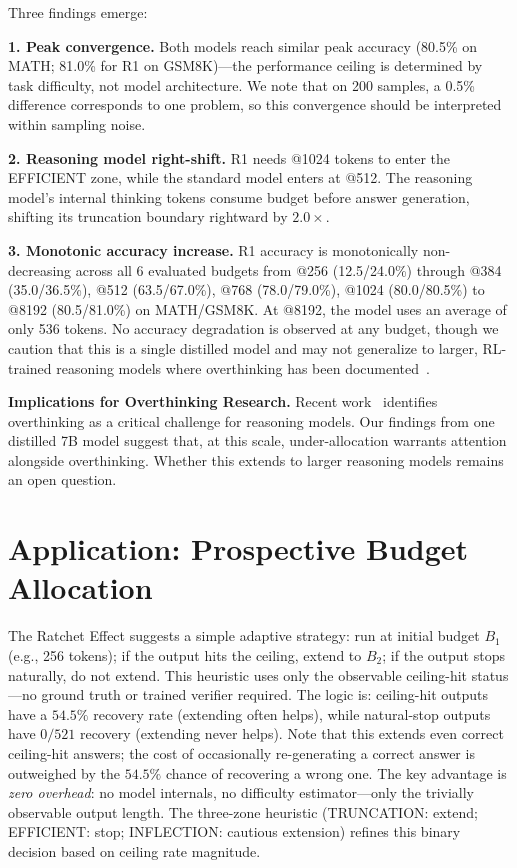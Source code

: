 \documentclass{article}
\begin{document}
Three findings emerge:

\textbf{1. Peak convergence.} Both models reach similar peak accuracy (80.5\% on MATH; 81.0\% for R1 on GSM8K)---the performance ceiling is determined by task difficulty, not model architecture. We note that on 200 samples, a 0.5\% difference corresponds to one problem, so this convergence should be interpreted within sampling noise.

\textbf{2. Reasoning model right-shift.} R1 needs @1024 tokens to enter the EFFICIENT zone, while the standard model enters at @512. The reasoning model's internal thinking tokens consume budget before answer generation, shifting its truncation boundary rightward by $2.0\times$.

\textbf{3. Monotonic accuracy increase.} R1 accuracy is monotonically non-decreasing across all 6 evaluated budgets from @256 (12.5/24.0\%) through @384 (35.0/36.5\%), @512 (63.5/67.0\%), @768 (78.0/79.0\%), @1024 (80.0/80.5\%) to @8192 (80.5/81.0\%) on MATH/GSM8K. At @8192, the model uses an average of only 536 tokens. No accuracy degradation is observed at any budget, though we caution that this is a single distilled model and may not generalize to larger, RL-trained reasoning models where overthinking has been documented~\cite{chen2024overthinking}.

\textbf{Implications for Overthinking Research.}
Recent work~\cite{chen2024overthinking,stoptoverthinking2025survey} identifies overthinking as a critical challenge for reasoning models. Our findings from one distilled 7B model suggest that, at this scale, under-allocation warrants attention alongside overthinking. Whether this extends to larger reasoning models remains an open question.

\section{Application: Prospective Budget Allocation}

The Ratchet Effect suggests a simple adaptive strategy: run at initial budget $B_1$ (e.g., 256 tokens); if the output hits the ceiling, extend to $B_2$; if the output stops naturally, do not extend. This heuristic uses only the observable ceiling-hit status---no ground truth or trained verifier required. The logic is: ceiling-hit outputs have a $54.5\%$ recovery rate (extending often helps), while natural-stop outputs have $0/521$ recovery (extending never helps). Note that this extends even correct ceiling-hit answers; the cost of occasionally re-generating a correct answer is outweighed by the $54.5\%$ chance of recovering a wrong one. The key advantage is \emph{zero overhead}: no model internals, no difficulty estimator---only the trivially observable output length. The three-zone heuristic (TRUNCATION: extend; EFFICIENT: stop; INFLECTION: cautious extension) refines this binary decision based on ceiling rate magnitude.
\end{document}
